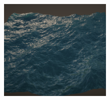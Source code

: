 \begin{minipage}{1\textwidth}
    \centering
    \includegraphics[width=0.40\textwidth]{"images/rendered_height_choppy.png"}
    \label{fig:ocean_choppy}
\end{minipage}



